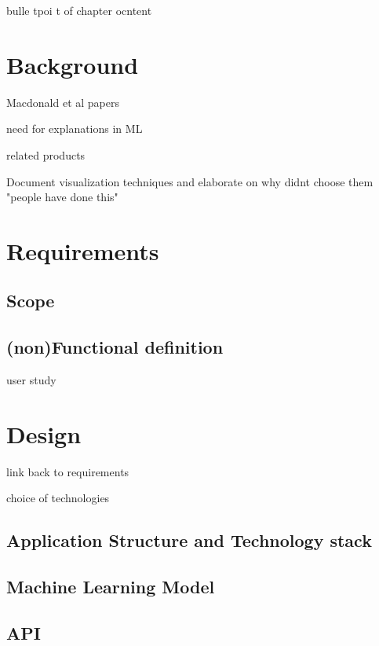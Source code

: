 \documentclass{l4proj}
\begin{document}
bulle tpoi t of chapter ocntent


\chapter{Background}

Macdonald et al papers


need for explanations in ML

related products

Document visualization techniques and elaborate on why didnt choose them
"people have done this"

\chapter{Requirements}

\section{Scope}

\section{(non)Functional definition}

user study


\chapter{Design}

link back to requirements

choice of technologies

\section{Application Structure and Technology stack}

\section{Machine Learning Model}

\section{API}
\end{document}
